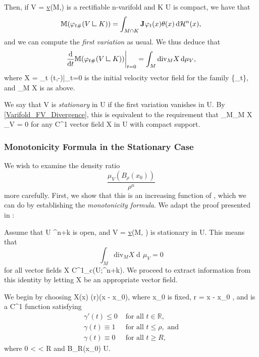 \documentclass[a4paper, 11pt]{article}
\theoremstyle{plain}
\theoremstyle{definition}
\theoremstyle{remark}
\DeclareMathOperator{\diff}{d \!}
\newcommand{\mres}{\mathrel{\vrule height 1.6ex depth 0pt width 0.13ex\vrule height 0.13ex depth 0pt width 1.3ex}} %
\renewcommand{\div}{\text{div}} %
\numberwithin{equation}{subsection}
\def\({}
\def\){}
\begin{document}
Then, if \(V = \underline{v}(M,\theta)\) is a rectifiable \(n\)-varifold and \(K \subset U\) is compact, we have that
\begin{equation}
\mathbb{M}(\varphi_{t\#}(V \mres K)) = \int_{M \cap K} \mathbf{J}_{} \varphi_{t}(x) \theta(x) \diff \mathcal{H}^{n}(x),
\end{equation}
and we can compute the \emph{first variation} as usual. We thus deduce that
\begin{equation}
\label{Varifold_FV_Divergence}
\frac{\!\diff}{\diff t}\mathbb{M}(\varphi_{t\#}(V \mres K))\bigg|_{t=0} = \int_{M} \div_{M} X \diff \mu_{V},
\end{equation}
where \(X = \partial_t \varphi(t,-)\big|_{t=0}\) is the initial velocity vector field for the family \(\{\varphi_t\}\), and \(\div_M X\) is as above.

We say that \(V\) is \emph{stationary} in \(U\) if the first variation vanishes in \(U\). By \eqref{Varifold_FV_Divergence}, this is equivalent to the requirement that \(\int_{M}\div_M X \diff \mu_V = 0\) for any \(C^1\) vector field \(X\) in \(U\) with compact support.

\subsubsection{Monotonicity Formula in the Stationary Case}

We wish to examine the density ratio
\begin{equation}
\frac{\mu_{V}(B_{\rho}(x_{0}))}{\rho^{n}}
\end{equation}
more carefully. First, we show that this is an increasing function of \(\rho\), which we can do by establishing the \emph{monotonicity formula}. We adapt the proof presented in \cite[Section 4.3]{Sim18}:

Assume that \(U \subset {}^{n+k}\) is open, and \(V = \underline{v}(M, \theta)\) is stationary in \(U\). This means that
\begin{equation}
\label{monotonicity_stationary_div=0}
\int_{M}\div_{M}X \diff\mu_{V} = 0
\end{equation}
for all vector fields \(X \in C^{1}_{c}(U;^{n+k})\). We proceed to extract information from this identity by letting \(X\) be an appropriate vector field.

We begin by choosing \(X(x) \coloneq \gamma(r)(x - x_{0})\), where \(x_{0}\) is fixed, \(r = \vert x - x_{0} \vert\), and \(\gamma \vcentcolon {} \rightarrow [0,1]\) is a \(C^{1}\) function satisfying
\begin{align}
\gamma'(t) \leqslant 0 &\text{ for all } t \in \mathbb{R}, \\ \gamma(t) \equiv 1 &\text{ for all } t \leqslant \rho, \text{ and}  \\ \gamma(t) \equiv 0 &\text{ for all } t \geqslant R,
\end{align}
where \(0 < \rho < R\) and \(B_{R}(x_{0}) \subset U\).
\end{document}
